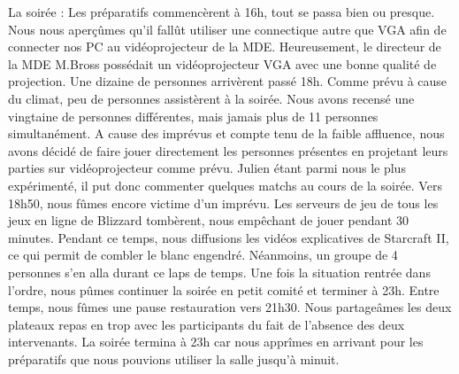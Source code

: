 La soirée :
Les préparatifs commencèrent à 16h, tout se passa bien ou presque. Nous nous aperçûmes 
qu’il fallût utiliser une connectique autre que VGA afin de connecter nos PC au 
vidéoprojecteur de la MDE. Heureusement, le directeur de la MDE M.Bross possédait un 
vidéoprojecteur VGA avec une bonne qualité de projection.
Une dizaine de personnes arrivèrent passé 18h. Comme prévu à cause du climat, peu de 
personnes assistèrent à la soirée. Nous avons recensé une vingtaine de personnes 
différentes, mais jamais plus de 11 personnes simultanément.
A cause des imprévus et compte tenu de la faible affluence, nous avons décidé de faire jouer 
directement les personnes présentes en projetant leurs parties sur vidéoprojecteur comme 
prévu. Julien étant parmi nous le plus expérimenté, il put donc commenter quelques matchs 
au cours de la soirée.
Vers 18h50, nous fûmes encore victime d’un imprévu. Les serveurs de jeu de tous les jeux en 
ligne de Blizzard tombèrent, nous empêchant de jouer pendant 30 minutes. Pendant ce 
temps, nous diffusions les vidéos explicatives de Starcraft II, ce qui permit de combler le 
blanc engendré. Néanmoins, un groupe de 4 personnes s’en alla durant ce laps de temps.
Une fois la situation rentrée dans l’ordre, nous pûmes continuer la soirée en petit comité et 
terminer à 23h. Entre temps, nous fûmes une pause restauration vers 21h30. Nous 
partageâmes les deux plateaux repas en trop avec les participants du fait de l’absence des 
deux intervenants. La soirée termina à 23h car nous apprîmes en arrivant pour les préparatifs 
que nous pouvions utiliser la salle jusqu’à minuit.
